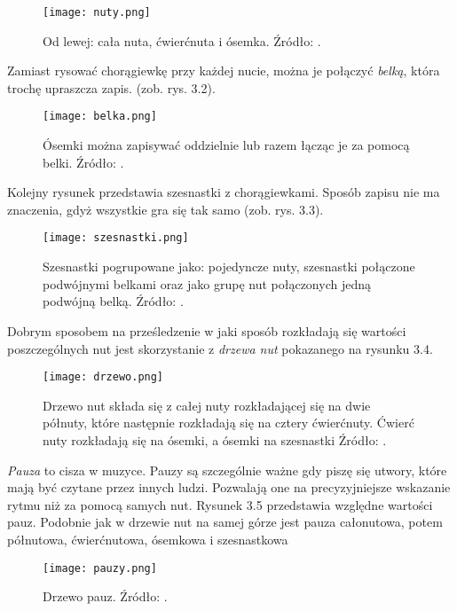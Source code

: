 \begin{figure}[H]
\texttt{[image: nuty.png]}
\centering
\caption{Od lewej: cała nuta, ćwierćnuta i ósemka. Źródło: \citep[s. 33]{Pilhofer2018}.}
\centering
\end{figure}

Zamiast rysować chorągiewkę przy każdej nucie, można je połączyć \textit{belką}, która trochę upraszcza zapis. (zob. rys. 3.2).

\begin{figure}[H]
\texttt{[image: belka.png]}
\centering
\caption{Ósemki można zapisywać oddzielnie lub razem łącząc je za pomocą belki. Źródło: \citep[s. 33]{Pilhofer2018}.}
\centering
\end{figure}
Kolejny rysunek przedstawia szesnastki z chorągiewkami. Sposób zapisu nie ma znaczenia, gdyż wszystkie gra się tak samo (zob. rys. 3.3).
\begin{figure}[H]
\texttt{[image: szesnastki.png]}
\centering
\caption{Szesnastki pogrupowane jako: pojedyncze nuty, szesnastki połączone podwójnymi belkami oraz jako grupę nut połączonych jedną podwójną belką. Źródło: \citep[s. 33]{Pilhofer2018}.}
\centering
\end{figure}

Dobrym sposobem na prześledzenie w jaki sposób rozkładają się wartości poszczególnych nut jest skorzystanie z \textit{drzewa nut} pokazanego na rysunku 3.4. 

\begin{figure}[H]
\texttt{[image: drzewo.png]}
\centering
\caption{Drzewo nut składa się z całej nuty rozkładającej się na dwie półnuty, które następnie rozkładają się na cztery ćwierćnuty. Ćwierć nuty rozkładają się na ósemki, a ósemki na szesnastki Źródło: \citep[s. 34]{Pilhofer2018}.}
\centering
\end{figure}

\textit{Pauza} to cisza w muzyce. Pauzy są szczególnie ważne gdy piszę się utwory, które mają być czytane przez innych ludzi. Pozwalają one na precyzyjniejsze wskazanie rytmu niż za pomocą samych nut. Rysunek 3.5 przedstawia względne wartości pauz. Podobnie jak w drzewie nut na samej górze jest pauza całonutowa, potem półnutowa, ćwierćnutowa, ósemkowa i szesnastkowa \citep[s. 40-41]{Pilhofer2018}

\begin{figure}[H]
\texttt{[image: pauzy.png]}
\centering
\caption{Drzewo pauz. Źródło: \citep[s. 42]{Pilhofer2018}.}
\centering
\end{figure}

